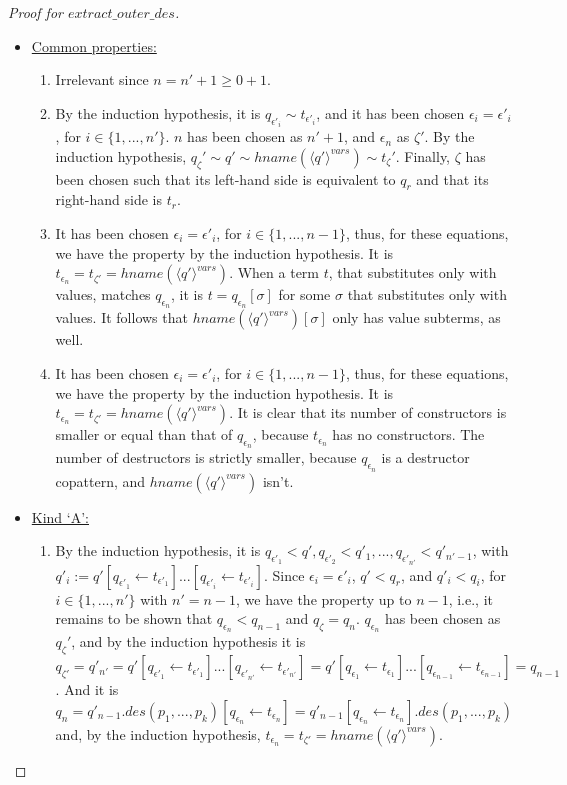 \documentclass[11pt]{article} %
\begin{document}
\begin{proof}[Proof for $extract\_outer\_des$]
\begin{itemize}
\begin{itemize}
\item \underline{Common properties:}
\begin{enumerate}
\item Irrelevant since $n = n' + 1 \geq 0 + 1$.
\item By the induction hypothesis, it is $q_{\epsilon'_i} \sim t_{\epsilon'_i}$, and it has been chosen $\epsilon_i = \epsilon'_i$, for $i \in \{1, ..., n'\}$. $n$ has been chosen as $n' + 1$, and $\epsilon_n$ as $\zeta'$. By the induction hypothesis, $q_\zeta' \sim q' \sim hname(\langle q' \rangle^{vars}) \sim t_\zeta'$. Finally, $\zeta$ has been chosen such that its left-hand side is equivalent to $q_r$ and that its right-hand side is $t_r$.
\item It has been chosen $\epsilon_i = \epsilon'_i$, for $i \in \{1, ..., n-1\}$, thus, for these equations, we have the property by the induction hypothesis. It is $t_{\epsilon_n} = t_{\zeta'} = hname(\langle q' \rangle^{vars})$. When a term $t$, that substitutes only with values, matches $q_{\epsilon_n}$, it is $t = q_{\epsilon_n}[\sigma]$ for some $\sigma$ that substitutes only with values. It follows that $hname(\langle q' \rangle^{vars})[\sigma]$ only has value subterms, as well.
\item It has been chosen $\epsilon_i = \epsilon'_i$, for $i \in \{1, ..., n-1\}$, thus, for these equations, we have the property by the induction hypothesis. It is $t_{\epsilon_n} = t_{\zeta'} = hname(\langle q' \rangle^{vars})$. It is clear that its number of constructors is smaller or equal than that of $q_{\epsilon_n}$, because $t_{\epsilon_n}$ has no constructors. The number of destructors is strictly smaller, because $q_{\epsilon_n}$ is a destructor copattern, and $hname(\langle q' \rangle^{vars})$ isn't.
\end{enumerate}

\item \underline{Kind `A':}
\begin{enumerate}
\item By the induction hypothesis, it is $q_{\epsilon'_1} < q', q_{\epsilon'_2} < q'_1, ..., q_{\epsilon'_{n'}} < q'_{n'-1}$, with $q'_i := q'[q_{\epsilon'_1} \leftarrow t_{\epsilon'_1}]...[q_{\epsilon'_i} \leftarrow t_{\epsilon'_i}]$. Since $\epsilon_i = \epsilon'_i$, $q' < q_r$, and $q'_i < q_i$, for $i \in \{1, ..., n'\}$ with $n' = n-1$, we have the property up to $n-1$, i.e., it remains to be shown that $q_{\epsilon_n} < q_{n-1}$ and $q_\zeta = q_n$. $q_{\epsilon_n}$ has been chosen as $q_\zeta'$, and by the induction hypothesis it is $q_{\zeta'} = q'_{n'} = q'[q_{\epsilon'_1} \leftarrow t_{\epsilon'_1}]...[q_{\epsilon'_{n'}} \leftarrow t_{\epsilon'_{n'}}] = q'[q_{\epsilon_1} \leftarrow t_{\epsilon_1}]...[q_{\epsilon_{n-1}} \leftarrow t_{\epsilon_{n-1}}] = q_{n-1}$. And it is $q_n = q'_{n-1}.des(p_1, ..., p_k)[q_{\epsilon_n} \leftarrow t_{\epsilon_n}] = q'_{n-1}[q_{\epsilon_n} \leftarrow t_{\epsilon_n}].des(p_1, ..., p_k)$ and, by the induction hypothesis, $t_{\epsilon_n} = t_{\zeta'} = hname(\langle q' \rangle^{vars})$.
\end{enumerate}


\end{itemize}
\end{itemize}
\end{proof}
\end{document}
